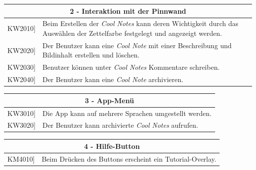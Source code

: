 \documentclass[a4paper]{scrreprt}
\begin{document}
		\begin{table}[h!]
			\centering
			\label{my-label}
			\begin{tabular}{p{2cm}p{12cm}}
				
				\multicolumn{2}{c}{\textbf{2 - Interaktion mit der Pinnwand}} \\ \hline
				\centering{[}KW2010{]} & Beim Erstellen der \textit{Cool Notes} kann deren Wichtigkeit durch das Auswählen der Zettelfarbe festgelegt und angezeigt werden.\\
				\centering{[}KW2020{]}& Der Benutzer kann eine \textit{Cool Note} mit einer Beschreibung und Bildinhalt erstellen und löschen.                              \\
				\centering{[}KW2030{]}& Benutzer können unter \textit{Cool Notes} Kommentare schreiben.\\ 
				\centering{[}KW2040{]}& Der Benutzer kann eine \textit{Cool Note} archivieren.\\ 
				\hline
			\end{tabular}
		\end{table}
		
		\vspace{5mm}
		
		\begin{table}[h!]
			\centering
			\label{my-label}
			\begin{tabular}{p{2cm}p{12cm}}
				
				\multicolumn{2}{c}{\textbf{3 - App-Menü}} \\ \hline
				\centering{[}KW3010{]} & Die App kann auf mehrere Sprachen umgestellt werden.\\
				\centering{[}KW3020{]} & Der Benutzer kann archivierte \textit{Cool Notes} aufrufen.\\
				\hline
			\end{tabular}
		\end{table}
		
		\vspace{5mm}
		
		\begin{table}[h!]
			\centering
			\label{my-label}
			\begin{tabular}{p{2cm}p{12cm}}
				
				\multicolumn{2}{c}{\textbf{4 - Hilfe-Button}} \\ \hline
				\centering{[}KM4010{]} & Beim Drücken des Buttons erscheint ein Tutorial-Overlay.\\
				
				
				\hline
			\end{tabular}
		\end{table}
	
\end{document}
